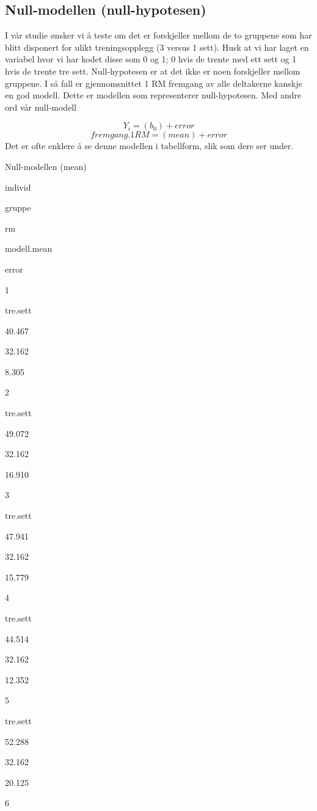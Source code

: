 \documentclass[
]{book}
\begin{document}
\hypertarget{null-modellen-null-hypotesen}{%
\subsection{Null-modellen (null-hypotesen)}\label{null-modellen-null-hypotesen}}

I vår studie ønsker vi å teste om det er forskjeller mellom de to gruppene som har blitt disponert for ulikt treningsopplegg (3 versus 1 sett). Husk at vi har laget en variabel hvor vi har kodet disse som 0 og 1; 0 hvis de trente med ett sett og 1 hvis de trente tre sett. Null-hypotesen er at det ikke er noen forskjeller mellom gruppene. I så fall er gjennomsnittet 1 RM fremgang av alle deltakerne kanskje en god modell. Dette er modellen som representerer null-hypotesen. Med andre ord vår null-modell

\[
Y_i = (b_0) + error
\]
\[
fremgang.1RM = (mean) + error
\]
Det er ofte enklere å se denne modellen i tabellform, slik som dere ser under.

\label{tab:unnamed-chunk-6}Null-modellen (mean)

individ

gruppe

rm

modell.mean

error

1

tre.sett

40.467

32.162

8.305

2

tre.sett

49.072

32.162

16.910

3

tre.sett

47.941

32.162

15.779

4

tre.sett

44.514

32.162

12.352

5

tre.sett

52.288

32.162

20.125

6
\end{document}
